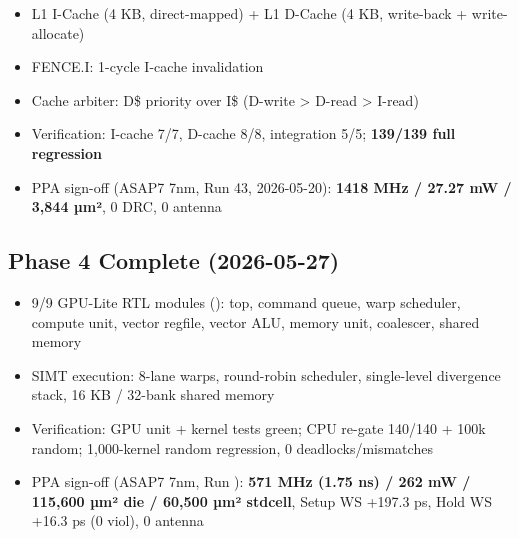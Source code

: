 \begin{record}

\begin{itemize}
\tightlist
\item
  \ok{} L1 I-Cache (4 KB, direct-mapped) + L1 D-Cache (4 KB, write-back
  + write-allocate)
\item
  \ok{} FENCE.I: 1-cycle I-cache invalidation
\item
  \ok{} Cache arbiter: D\$ priority over I\$ (D-write \textgreater{}
  D-read \textgreater{} I-read)
\item
  \ok{} Verification: I-cache 7/7, D-cache 8/8, integration 5/5;
  \textbf{139/139 full regression}
\item
  \ok{} PPA sign-off (ASAP7 7nm, Run 43, 2026-05-20): \textbf{1418 MHz /
  27.27 mW / 3,844 µm²}, 0 DRC, 0 antenna
\end{itemize}

\end{record}

\subsection{\texorpdfstring{Phase 4 Complete \ok{}
(2026-05-27)}{Phase 4 Complete  (2026-05-27)}}\label{cr:status:phase-history:phase-4-complete-white-check-mark-2026-05-27}

\begin{record}

\begin{itemize}
\tightlist
\item
  \ok{} 9/9 GPU-Lite RTL modules (): top, command queue,
  warp scheduler, compute unit, vector regfile, vector ALU, memory unit,
  coalescer, shared memory
\item
  \ok{} SIMT execution: 8-lane warps, round-robin scheduler,
  single-level divergence stack, 16 KB / 32-bank shared memory
\item
  \ok{} Verification: GPU unit + kernel tests green; CPU re-gate 140/140
  + 100k random; 1,000-kernel random regression, 0
  deadlocks/\allowbreak{}mismatches
\item
  \ok{} PPA sign-off (ASAP7 7nm, Run ):
  \textbf{571 MHz (1.75 ns) / 262 mW / 115,600 µm² die / 60,500 µm²
  stdcell}, Setup WS +197.3 ps, Hold WS +16.3 ps (0 viol), 0 antenna
\end{itemize}

\end{record}

